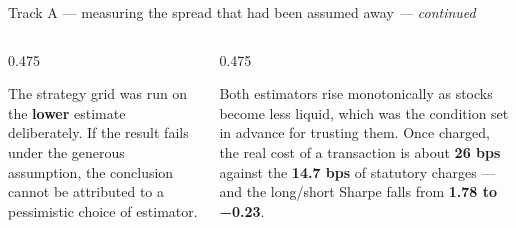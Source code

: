 \documentclass[aspectratio=169,10pt]{beamer}
\makeatletter
\newcommand{\eyebrow}[1]{\def\@eyebrow{#1}}
\newcommand{\bodytext}[1]{{\sffamily\fontsize{7.4}{9.7}\selectfont\color{ink2}#1\par}}
\newcommand{\str}[1]{{\color{ink}\bfseries #1}}
\makeatother
\begin{document}
\eyebrow{Phase 4c}
\begin{frame}[t]{Track A — measuring the spread that had been assumed away \textnormal{\itshape --- continued}}
\begin{columns}[T]\begin{column}{0.475\textwidth}\bodytext{The strategy grid was run on the \str{lower} estimate deliberately. If the result fails under the generous assumption, the conclusion cannot be attributed to a pessimistic choice of estimator.}\end{column}\begin{column}{0.475\textwidth}\bodytext{Both estimators rise monotonically as stocks become less liquid, which was the condition set in advance for trusting them. Once charged, the real cost of a transaction is about \str{26 bps} against the \str{14.7 bps} of statutory charges — and the long/short Sharpe falls from \str{1.78 to −0.23}.}\end{column}\end{columns}
\end{frame}
\eyebrow{Phase 4c}
\end{document}
